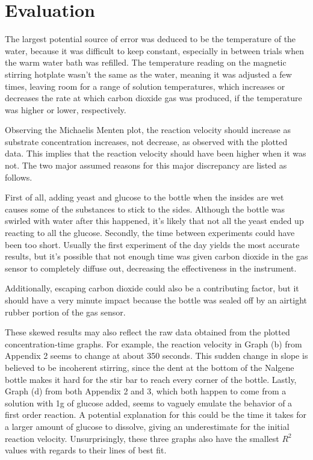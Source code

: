\documentclass{article}
\begin{document}
\section{Evaluation}
The largest potential source of error was deduced to be the temperature of the water, because it was difficult to keep constant, especially in between trials when the warm water bath was refilled. The temperature reading on the magnetic stirring hotplate wasn't the same as the water, meaning it was adjusted a few times, leaving room for a range of solution temperatures, which increases or decreases the rate at which carbon dioxide gas was produced, if the temperature was higher or lower, respectively.

\medskip

Observing the Michaelis Menten plot, the reaction velocity should increase as substrate concentration increases, not decrease, as observed with the plotted data. This implies that the reaction velocity should have been higher when it was not. The two major assumed reasons for this major discrepancy are listed as follows.

\medskip

First of all, adding yeast and glucose to the bottle when the insides are wet causes some of the substances to stick to the sides. Although the bottle was swirled with water after this happened, it's likely that not all the yeast ended up reacting to all the glucose. Secondly, the time between experiments could have been too short. Usually the first experiment of the day yields the most accurate results, but it's possible that not enough time was given carbon dioxide in the  gas sensor to completely diffuse out, decreasing the effectiveness in the instrument.

\medskip

Additionally, escaping carbon dioxide could also be a contributing factor, but it should have a very minute impact because the bottle was sealed off by an airtight rubber portion of the  gas sensor.

\medskip
These skewed results may also reflect the raw data obtained from the plotted concentration-time graphs. For example, the reaction velocity in Graph (b) from Appendix 2 seems to change at about 350 seconds. This sudden change in slope is believed to be incoherent stirring, since the dent at the bottom of the Nalgene bottle makes it hard for the stir bar to reach every corner of the bottle. Lastly, Graph (d) from both Appendix 2 and 3, which both happen to come from a solution with 1g of glucose added, seems to vaguely emulate the behavior of a first order reaction. A potential explanation for this could be the time it takes for a larger amount of glucose to dissolve, giving an underestimate for the initial reaction velocity. Unsurprisingly, these three graphs also have the smallest $R^2$ values with regards to their lines of best fit.
\end{document}

